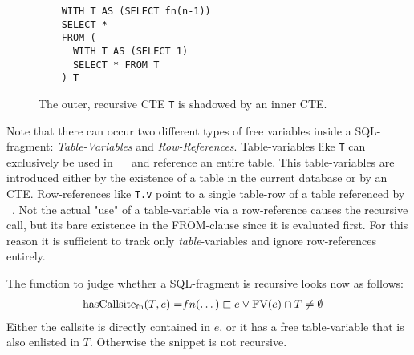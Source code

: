 \begin{wrapfigure}{r}{0.4\textwidth}
    \begin{verbatim}
    WITH T AS (SELECT fn(n-1))
    SELECT *
    FROM (
      WITH T AS (SELECT 1)
      SELECT * FROM T
    ) T
    \end{verbatim}
    \caption{The outer, recursive CTE \texttt{T} is shadowed by an inner CTE.}
    \label{lst:indirect_callsite_ref}
\end{wrapfigure}

Note that there can occur two different types of free variables inside a SQL-fragment: \textit{Table-Variables} and \textit{Row-References}. Table-variables like \texttt{T} can exclusively be used in ~\FROM~ and reference an entire table. This table-variables are introduced either by the existence of a table in the current database or by an CTE. Row-references like \texttt{T.v} point to a single table-row of a table referenced by ~\FROM. Not the actual "use" of a table-variable via a row-reference causes the recursive call, but its bare existence in the FROM-clause since it is evaluated first. For this reason it is sufficient to track only \textit{table}-variables and ignore row-references entirely.

The function to judge whether a SQL-fragment is recursive looks now as follows:
\begin{align*}
    \operatorname{\text{hasCallsite}_{fn}}(T, e) =& fn(\dots) \sqsubset e \lor \operatorname{\text{\rm FV}}(e) \cap T \neq \emptyset
\end{align*}
Either the callsite is directly contained in $e$, or it has a free table-variable that is also enlisted in $T$. Otherwise the snippet is not recursive.



